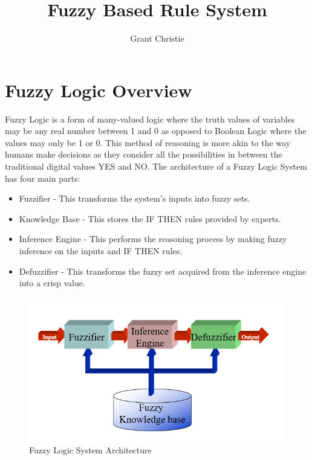 \documentclass{article}
\title{Fuzzy Based Rule System}
\author{Grant Christie}
\date{}
\begin{document}
\maketitle

\section{Fuzzy Logic Overview}
Fuzzy Logic is a form of many-valued logic where the truth values of variables may be any real number between 1 and 0 as opposed to Boolean Logic where the values may only be 1 or 0. This method of reasoning is more akin to the way humans make decisions as they consider all the possibilities in between the traditional digital values YES and NO. The architecture of a Fuzzy Logic System has four main parts:

\begin{itemize}
  \item Fuzzifier - This transforms the system’s inputs into fuzzy sets.
  \item Knowledge Base - This stores the IF THEN rules provided by experts.
  \item Inference Engine - This performs the reasoning process by making fuzzy inference on the inputs and IF THEN rules.
  \item Defuzzifier - This transforms the fuzzy set acquired from the inference engine into a crisp value.
\end{itemize}

\begin{figure}[H]
\includegraphics[width=12cm]{architecture}
\caption{Fuzzy Logic System Architecture}
\end{figure}
\end{document}
